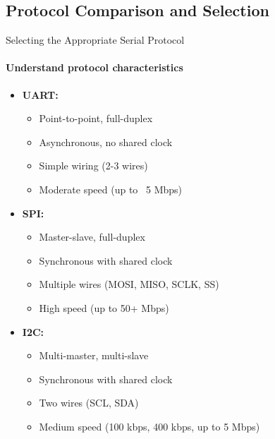\subsection{Protocol Comparison and Selection}

\begin{KR}{Selecting the Appropriate Serial Protocol}
\paragraph{Understand protocol characteristics}
\begin{itemize}
    \item \textbf{UART:}
    \begin{itemize}
        \item Point-to-point, full-duplex
        \item Asynchronous, no shared clock
        \item Simple wiring (2-3 wires)
        \item Moderate speed (up to ~5 Mbps)
    \end{itemize}
    \item \textbf{SPI:}
    \begin{itemize}
        \item Master-slave, full-duplex
        \item Synchronous with shared clock
        \item Multiple wires (MOSI, MISO, SCLK, SS)
        \item High speed (up to 50+ Mbps)
    \end{itemize}
    \item \textbf{I2C:}
    \begin{itemize}
        \item Multi-master, multi-slave
        \item Synchronous with shared clock
        \item Two wires (SCL, SDA)
        \item Medium speed (100 kbps, 400 kbps, up to 5 Mbps)
    \end{itemize}
\end{itemize}


\end{KR}
